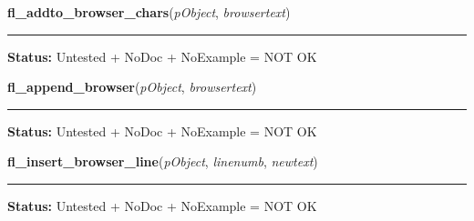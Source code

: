     \label{xformslib:library:fl_addto_browser_chars}

    \vspace{0.5ex}

\hspace{.8\funcindent}\begin{boxedminipage}{\funcwidth}

    \raggedright \textbf{fl\_addto\_browser\_chars}(\textit{pObject}, \textit{browsertext})

    \vspace{-1.5ex}

    \rule{\textwidth}{0.5\fboxrule}
\setlength{\parskip}{2ex}
\setlength{\parskip}{1ex}
\textbf{Status:} Untested + NoDoc + NoExample = NOT OK



    \end{boxedminipage}

    \label{xformslib:library:fl_addto_browser_chars}

    \vspace{0.5ex}

\hspace{.8\funcindent}\begin{boxedminipage}{\funcwidth}

    \raggedright \textbf{fl\_append\_browser}(\textit{pObject}, \textit{browsertext})

    \vspace{-1.5ex}

    \rule{\textwidth}{0.5\fboxrule}
\setlength{\parskip}{2ex}
\setlength{\parskip}{1ex}
\textbf{Status:} Untested + NoDoc + NoExample = NOT OK



    \end{boxedminipage}

    \label{xformslib:library:fl_insert_browser_line}

    \vspace{0.5ex}

\hspace{.8\funcindent}\begin{boxedminipage}{\funcwidth}

    \raggedright \textbf{fl\_insert\_browser\_line}(\textit{pObject}, \textit{linenumb}, \textit{newtext})

    \vspace{-1.5ex}

    \rule{\textwidth}{0.5\fboxrule}
\setlength{\parskip}{2ex}
\setlength{\parskip}{1ex}
\textbf{Status:} Untested + NoDoc + NoExample = NOT OK



    \end{boxedminipage}

